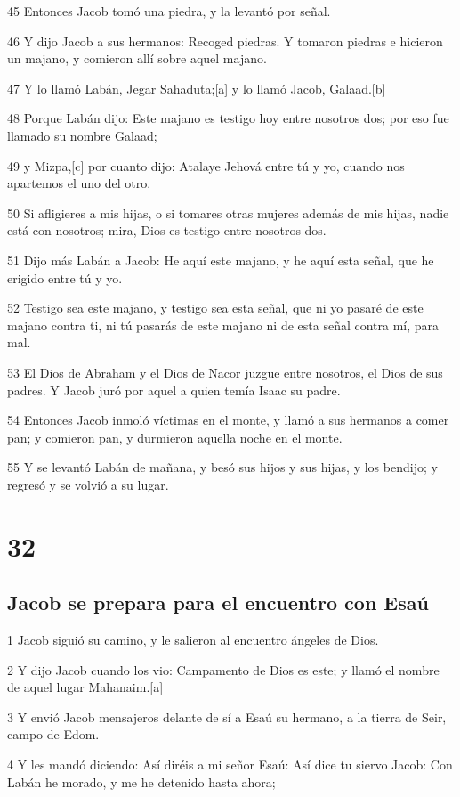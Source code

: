 45 Entonces Jacob tomó una piedra, y la levantó por señal.

46 Y dijo Jacob a sus hermanos: Recoged piedras. Y tomaron piedras e hicieron un majano, y comieron allí sobre aquel majano.

47 Y lo llamó Labán, Jegar Sahaduta;[a] y lo llamó Jacob, Galaad.[b]

48 Porque Labán dijo: Este majano es testigo hoy entre nosotros dos; por eso fue llamado su nombre Galaad;

49 y Mizpa,[c] por cuanto dijo: Atalaye Jehová entre tú y yo, cuando nos apartemos el uno del otro.

50 Si afligieres a mis hijas, o si tomares otras mujeres además de mis hijas, nadie está con nosotros; mira, Dios es testigo entre nosotros dos.

51 Dijo más Labán a Jacob: He aquí este majano, y he aquí esta señal, que he erigido entre tú y yo.

52 Testigo sea este majano, y testigo sea esta señal, que ni yo pasaré de este majano contra ti, ni tú pasarás de este majano ni de esta señal contra mí, para mal.

53 El Dios de Abraham y el Dios de Nacor juzgue entre nosotros, el Dios de sus padres. Y Jacob juró por aquel a quien temía Isaac su padre.

54 Entonces Jacob inmoló víctimas en el monte, y llamó a sus hermanos a comer pan; y comieron pan, y durmieron aquella noche en el monte.

55 Y se levantó Labán de mañana, y besó sus hijos y sus hijas, y los bendijo; y regresó y se volvió a su lugar.

\chapter{32}

\section{Jacob se prepara para el encuentro con Esaú}

1 Jacob siguió su camino, y le salieron al encuentro ángeles de Dios.

2 Y dijo Jacob cuando los vio: Campamento de Dios es este; y llamó el nombre de aquel lugar Mahanaim.[a]

3 Y envió Jacob mensajeros delante de sí a Esaú su hermano, a la tierra de Seir, campo de Edom.

4 Y les mandó diciendo: Así diréis a mi señor Esaú: Así dice tu siervo Jacob: Con Labán he morado, y me he detenido hasta ahora;

